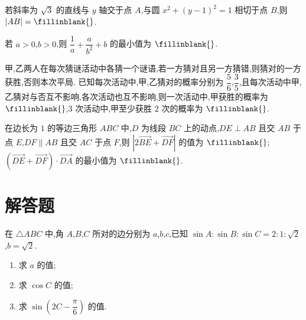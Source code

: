 \begin{problem}
若斜率为 \( \sqrt3 \) 的直线与 \( y \) 轴交于点 \(A\),与圆 \( x^2+\left( y-1 \right)^2=1 \) 相切于点 \(B\),则 \( |AB|=\fillinblank{} \).
\end{problem}

\begin{problem}
若 \( a>0 \),\( b>0 \),则 \( \dfrac{1}{a}+\dfrac{a}{b^2}+b \) 的最小值为 \(\fillinblank{}\).
\end{problem}

\begin{problem}
甲,乙两人在每次猜谜活动中各猜一个谜语,若一方猜对且另一方猜错,则猜对的一方获胜,否则本次平局. 已知每次活动中,甲,乙猜对的概率分别为 \( \dfrac{5}{6} \),\( \dfrac{3}{5} \),且每次活动中甲,乙猜对与否互不影响,各次活动也互不影响,则一次活动中,甲获胜的概率为 \(\fillinblank{}\),\( 3 \) 次活动中,甲至少获胜 \( 2 \) 次的概率为 \(\fillinblank{}\).
\end{problem}





\begin{problem}
在边长为 \( 1 \) 的等边三角形 \(ABC\) 中,\(D\) 为线段 \(BC\) 上的动点,\( DE\perp AB \) 且交 \(AB\) 于点 \(E\),\( DF\parallel AB \) 且交 \(AC\) 于点 \(F\),则 \( \left| 2\overrightarrow{BE}+\overrightarrow{DF} \right| \) 的值为 \(\fillinblank{}\);\( \left( \overrightarrow{DE}+\overrightarrow{DF} \right)\cdot \overrightarrow{DA} \) 的最小值为 \(\fillinblank{}\).

\end{problem}




\section{解答题}

\begin{problem}
在 \( \triangle ABC \) 中,角 \(A\),\(B\),\(C\) 所对的边分别为 \( a \),\( b \),\( c \),已知 \( \sin A:\sin B:\sin C=2:1:\sqrt2 \),\( b=\sqrt2 \).

\begin{enumerate}
\item 求 \( a \) 的值;
\item 求 \( \cos C \) 的值;
\item 求 \( \sin\left( 2C-\dfrac{\pi}{6} \right) \) 的值.
\end{enumerate}
\end{problem}

